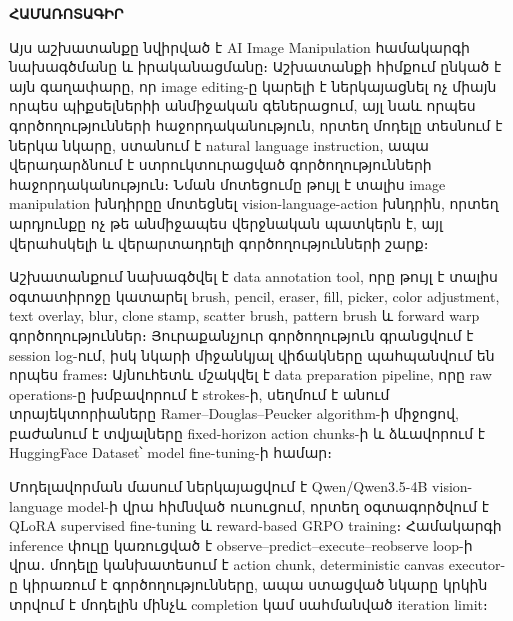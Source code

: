 \documentclass[12pt,a4paper]{report}
\newcommand{\Eng}[1]{\textenglish{#1}}
\begin{document}
\newpage

\thispagestyle{empty}
\begin{center}
{\bfseries ՀԱՄԱՌՈՏԱԳԻՐ}
\end{center}


Այս աշխատանքը նվիրված է \Eng{AI Image Manipulation} համակարգի նախագծմանը և իրականացմանը։ Աշխատանքի հիմքում ընկած է այն գաղափարը, որ image editing-ը կարելի է ներկայացնել ոչ միայն որպես պիքսելներիի անմիջական գեներացում, այլ նաև որպես գործողությունների հաջորդականություն, որտեղ մոդելը տեսնում է ներկա նկարը, ստանում է natural language instruction, ապա վերադարձնում է ստրուկտուրացված գործողությունների հաջորդականություն։ Նման մոտեցումը թույլ է տալիս image manipulation խնդիրըը մոտեցնել \Eng{vision-language-action} խնդրին, որտեղ արդյունքը ոչ թե անմիջապես վերջնական պատկերն է, այլ վերահսկելի և վերարտադրելի գործողությունների շարք։

Աշխատանքում նախագծվել է data annotation tool, որը թույլ է տալիս օգտատիրոջը կատարել brush, pencil, eraser, fill, picker, color adjustment, text overlay, blur, clone stamp, scatter brush, pattern brush և forward warp գործողություններ։ Յուրաքանչյուր գործողություն գրանցվում է session log-ում, իսկ նկարի միջանկյալ վիճակները պահպանվում են որպես frames։ Այնուհետև մշակվել է data preparation pipeline, որը raw operations-ը խմբավորում է strokes-ի, սեղմում է անում տրայեկտորիաները \Eng{Ramer--Douglas--Peucker} algorithm-ի միջոցով, բաժանում է տվյալները fixed-horizon action chunks-ի և ձևավորում է \Eng{HuggingFace Dataset}՝ model fine-tuning-ի համար։

Մոդելավորման մասում ներկայացվում է \Eng{Qwen/Qwen3.5-4B} vision-language model-ի վրա հիմնված ուսուցում, որտեղ օգտագործվում է \Eng{QLoRA} supervised fine-tuning և reward-based \Eng{GRPO} training։ Համակարգի inference փուլը կառուցված է observe--predict--execute--reobserve loop-ի վրա․ մոդելը կանխատեսում է action chunk, deterministic canvas executor-ը կիրառում է գործողությունները, ապա ստացված նկարը կրկին տրվում է մոդելին մինչև completion կամ սահմանված iteration limit։
\end{document}
